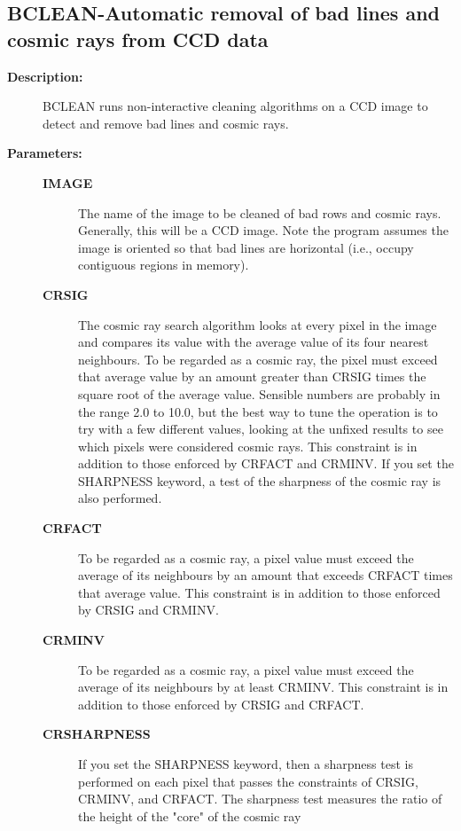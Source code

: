 \subsection{BCLEAN-\label{BCLEAN}Automatic removal of bad lines and cosmic rays from CCD data}
\begin{description}

\item [\textbf{Description:}]
 BCLEAN runs non-interactive cleaning algorithms on a CCD image
 to detect and remove bad lines and cosmic rays.

\item [\textbf{Parameters:}]
\begin{description}
\item [\textbf{IMAGE}]
 The name of the image to be cleaned of bad rows and cosmic rays.
 Generally, this will be a CCD image.  Note the program assumes
 the image is oriented so that bad lines are horizontal (i.e.,
 occupy contiguous regions in memory).
\item [\textbf{CRSIG}]
 The cosmic ray search algorithm looks at every pixel in the image
 and compares its value with the average value of its four nearest
 neighbours.  To be regarded as a cosmic ray, the pixel must exceed
 that average value by an amount greater than CRSIG times the square
 root of the average value.  Sensible numbers are probably in the
 range 2.0 to 10.0, but the best way to tune the operation is to try
 with a few different values, looking at the unfixed results to see
 which pixels were considered cosmic rays.  This constraint is in
 addition to those enforced by CRFACT and CRMINV.  If you set the
 SHARPNESS keyword, a test of the sharpness of the cosmic ray is
 also performed.
\item [\textbf{CRFACT}]
 To be regarded as a cosmic ray, a pixel value must exceed
 the average of its neighbours by an amount that exceeds
 CRFACT times that average value.  This constraint is in
 addition to those enforced by CRSIG and CRMINV.
\item [\textbf{CRMINV}]
 To be regarded as a cosmic ray, a pixel value must exceed
 the average of its neighbours by at least CRMINV.  This
 constraint is in addition to those enforced by CRSIG and
 CRFACT.
\item [\textbf{CRSHARPNESS}]
 If you set the SHARPNESS keyword, then a sharpness
 test is performed on each pixel that passes the constraints
 of CRSIG, CRMINV, and CRFACT. The sharpness test measures
 the ratio of the height of the "core" of the cosmic ray

\end{description}
\end{description}
